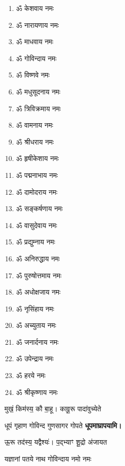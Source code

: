 \begin{center}
\begin{multicols}{2}
\begin{enumerate}
\item ॐ केशवाय नमः
\item ॐ नारायणाय नमः
\item ॐ माधवाय नमः
\item ॐ गोविन्दाय नमः
\item ॐ विष्णवे नमः 
\item ॐ मधुसूदनाय नमः
\item ॐ त्रिविक्रमाय नमः
\item ॐ वामनाय नमः
\item ॐ श्रीधराय नमः
\item ॐ हृषीकेशाय नमः
\item ॐ पद्मनाभाय नमः
\item ॐ दामोदराय नमः
\item ॐ सङ्कर्षणाय नमः
\item ॐ वासुदेवाय नमः
\item ॐ प्रद्युम्नाय नमः
\item ॐ अनिरुद्धाय नमः
\item ॐ पुरुषोत्तमाय नमः
\item ॐ अधोक्षजाय नमः
\item ॐ नृसिंहाय नमः
\item ॐ अच्युताय नमः
\item ॐ जनार्दनाय नमः
\item ॐ उपेन्द्राय नमः 
\item ॐ हरये नमः
\item ॐ श्रीकृष्णाय नमः
\end{enumerate}
\end{multicols}

\begingroup
\centering
\setlength{\columnseprule}{1pt}
\let\chapt\sect
\needspace{6em}

\endgroup


{मुखं॒ किम॑स्य॒ कौ बा॒हू। कावू॒रू पादा॑वुच्येते}

{धूपं गृहाण गोविन्द गुणसागर गोपते}
\textbf{\devAya{} धूपमाघ्रापयामि।}
\medskip

{ऊ॒रू तद॑स्य॒ यद्वैश्यः॑। प॒द्भ्याꣳ शू॒द्रो अ॑जायत}

{यज्ञानां पतये नाथ गोविन्दाय नमो नमः}


\end{center}
